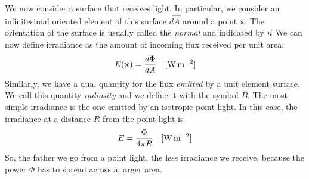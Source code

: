 We now consider a surface that receives light. In particular, we consider an infinitesimal oriented element of this surface $d \vec{A}$ around a point $\mathbf{x}$. The orientation of the surface is usually called the \emph{normal} and indicated by $\vec{n}$ We can now define irradiance as the amount of incoming flux received per unit area:
\begin{equation*}
E(\mathbf{x}) = \frac{d \Phi}{d A}  \ \ \ [\SI{}{\watt \per \square \metre}]
\end{equation*}
Similarly, we have a dual quantity for the flux \emph{emitted} by a unit element surface. We call this quantity \emph{radiosity} and we define it with the symbol $B$.
The most simple irradiance is the one emitted by an isotropic point light. In this case, the irradiance at a distance $R$ from the point light is 
\begin{equation*}
E = \frac{\Phi}{4 \pi R} \ \ \ [\SI{}{\watt \per \square \metre}]
\end{equation*}
So, the father we go from a point light, the less irradiance we receive, because the power $\Phi$ has to spread across a larger area.

